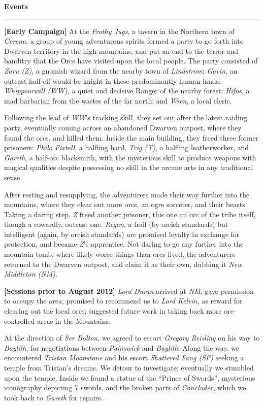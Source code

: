 \documentclass[letterpaper]{article}
\newlength\tindent
\newcommand{\e}[1]{\emph{#1}}
\newcommand{\B}[1]{\textbf{#1}}
\newenvironment{notesection}[1]
{ {\huge \B{#1}}\hrule\vspace{0.5em}\begingroup\fontsize{9pt}{12pt}\selectfont}
{\endgroup}
\begin{document}
\begin{notesection}{Events}
\setlength{\parindent}{\tindent}
\B{[Early Campaign]} At the \e{Frothy Jugs}, a tavern in the Northern town of \e{Cerena}, a group of young adventurous spirits formed a party to go forth into Dwarven territory in the high mountains, and put an end to the terror and banditry that the Orcs have visited upon the local people. The party consisted of \e{Zaru (Z)}, a gnomish wizard from the nearby town of \e{Lindstrom}; \e{Gavin}, an outcast half-elf would-be knight in these predominantly human lands; \e{Whippoorwill (WW)}, a quiet and decisive Ranger of the nearby forest; \e{Hifos}, a mad barbarian from the wastes of the far north; and \e{Wren}, a local cleric.

Following the lead of \e{WW}'s tracking skill, they set out after the latest raiding party, eventually coming across an abandoned Dwarven outpost, where they found the orcs, and killed them.  Inside the main building, they freed three former prisoners: \e{Philo Fixtell}, a halfling bard, \e{Trig (T)}, a halfling leatherworker, and \e{Gareth}, a half-orc blacksmith, with the mysterious skill to produce weapons with magical qualities despite possessing no skill in the arcane arts in any traditional sense.

After resting and resupplying, the adventurers made their way further into the mountains, where they clear out more orcs, an ogre sorcerer, and their beasts. Taking a daring step, \e{Z} freed another prisoner, this one an orc of the tribe itself, though a cowardly, outcast one.  \e{Regan}, a frail (by orcish standards) but intelligent (again, by orcish standards) orc promised loyalty in exchange for protection, and became \e{Z}'s apprentice. Not daring to go any further into the mountain tomb, where likely worse things than orcs lived, the adventurers returned to the Dwarven outpost, and claim it as their own, dubbing it \e{New Middleton (NM)}.

\B{[Sessions prior to August 2012]} \e{Lord Duran} arrived at \e{NM}, gave permission to occupy the area; promised to recommend us to \e{Lord Kelvin}, as reward for clearing out the local orcs; suggested future work in taking back more orc-controlled areas in the Mountains. 

At the direction of \e{Ser Bolton}, we agreed to escort \e{Gregory Reisling} on his way to \e{Baylith}, for negotiations between \e{Painswick} and \e{Baylith}.  Along the way, we encountered \e{Tristan Moonstone} and his escort \e{Shattered Fang (SF)} seeking a temple from Tristan's dreams. We detour to investigate; eventually we stumbled upon the temple.  Inside we found a statue of the ``Prince of Swords'', mysterious iconography depicting 7 swords, and the broken parts of \e{Concluder}, which we took back to \e{Gareth} for repairs.


\end{notesection}
\end{document}
